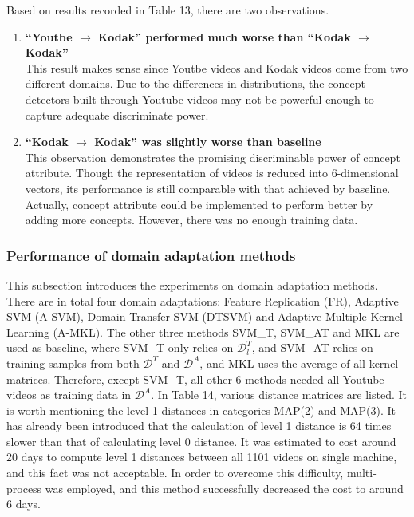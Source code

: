 \noindent Based on results recorded in Table 13, there are two observations.
\begin{enumerate}
  \item{\bf ``Youtbe $\to$ Kodak'' performed much worse than ``Kodak $\to$ Kodak''}\\ This result makes sense since Youtbe videos and Kodak videos come from two different domains. Due to the differences in distributions, the concept detectors built through Youtube videos may not be powerful enough to capture adequate discriminate power. 

  \item{\bf ``Kodak $\to$ Kodak'' was slightly worse than baseline}\\
  This observation demonstrates the promising discriminable power of concept attribute. Though the representation of videos is reduced into 6-dimensional vectors, its performance is still comparable with that achieved by baseline. Actually, concept attribute could be implemented to perform better by adding more concepts. However, there was no enough training data. 
\end{enumerate}


\subsubsection{Performance of domain adaptation methods}
This subsection introduces the experiments on domain adaptation methods. There are in total four domain adaptations: Feature Replication (FR), Adaptive SVM (A-SVM), Domain Transfer SVM (DTSVM) and Adaptive Multiple Kernel Learning (A-MKL). The other three methods SVM\_T, SVM\_AT and MKL are used as baseline, where SVM\_T only relies on $\mathcal{D}_l^T$, and SVM\_AT relies on training samples from both $\mathcal{D}^T$ and $\mathcal{D}^A$, and MKL uses the average of all kernel matrices. Therefore, except SVM\_T, all other 6 methods needed all Youtube videos as training data in $\mathcal{D}^A$. In Table 14, various distance matrices are listed. It is worth mentioning the level 1 distances in categories MAP(2) and MAP(3). It has already been introduced that the calculation of level 1 distance is 64 times slower than that of calculating level 0 distance. It was estimated to cost around 20 days to compute level 1 distances between all 1101 videos on single machine, and this fact was not acceptable. In order to overcome this difficulty, multi-process was employed, and this method successfully decreased the cost to around 6 days. \\ 

